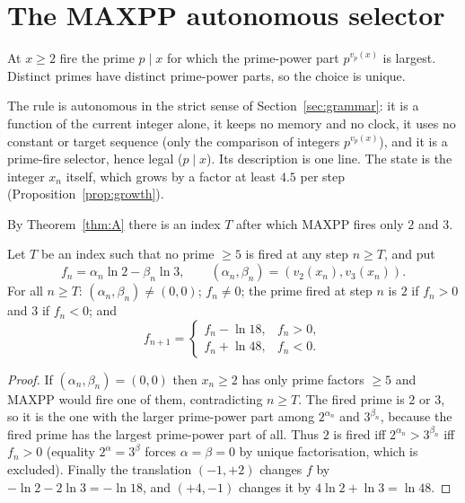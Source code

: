 \section{The MAXPP autonomous selector}\label{sec:maxpp}
\begin{definition}[MAXPP]\label{def:maxpp}
At $x\ge2$ fire the prime $p\mid x$ for which the prime-power part $p^{v_p(x)}$ is largest. Distinct primes have distinct prime-power parts, so the choice is unique.
\end{definition}
The rule is autonomous in the strict sense of Section~\ref{sec:grammar}: it is a function of the current integer alone, it keeps no memory and no clock, it uses no constant or target sequence (only the comparison of integers $p^{v_p(x)}$), and it is a prime-fire selector, hence legal ($p\mid x$). Its description is one line. The state is the integer $x_n$ itself, which grows by a factor at least $4.5$ per step (Proposition~\ref{prop:growth}).

By Theorem~\ref{thm:A} there is an index $T$ after which \textsf{MAXPP} fires only $2$ and $3$.
\begin{proposition}\label{prop:twocounter}
Let $T$ be an index such that no prime $\ge5$ is fired at any step $n\ge T$, and put
\[
f_n=\alpha_n\ln2-\beta_n\ln3,\qquad(\alpha_n,\beta_n)=(v_2(x_n),v_3(x_n)).
\]
For all $n\ge T$: $(\alpha_n,\beta_n)\ne(0,0)$; $f_n\ne0$; the prime fired at step $n$ is $2$ if $f_n>0$ and $3$ if $f_n<0$; and
\[
f_{n+1}=\begin{cases}f_n-\ln18,& f_n>0,\\ f_n+\ln48,& f_n<0.\end{cases}
\]
\end{proposition}
\begin{proof}
If $(\alpha_n,\beta_n)=(0,0)$ then $x_n\ge2$ has only prime factors $\ge5$ and \textsf{MAXPP} would fire one of them, contradicting $n\ge T$. The fired prime is $2$ or $3$, so it is the one with the larger prime-power part among $2^{\alpha_n}$ and $3^{\beta_n}$, because the fired prime has the largest prime-power part of all. Thus $2$ is fired iff $2^{\alpha_n}>3^{\beta_n}$ iff $f_n>0$ (equality $2^\alpha=3^\beta$ forces $\alpha=\beta=0$ by unique factorisation, which is excluded). Finally the translation $(-1,+2)$ changes $f$ by $-\ln2-2\ln3=-\ln18$, and $(+4,-1)$ changes it by $4\ln2+\ln3=\ln48$. \end{proof}

